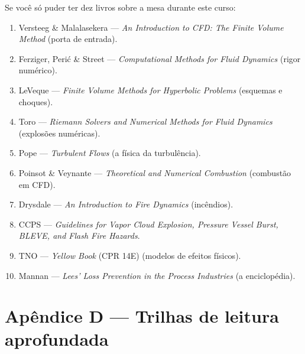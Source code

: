 \documentclass[10pt,a4paper,twocolumn,openany]{report}
\begin{document}
Se você só puder ter dez livros sobre a mesa durante este curso:
\begin{enumerate}
  \item Versteeg \& Malalasekera --- \emph{An Introduction to CFD: The Finite Volume Method} (porta de entrada).
  \item Ferziger, Perić \& Street --- \emph{Computational Methods for Fluid Dynamics} (rigor numérico).
  \item LeVeque --- \emph{Finite Volume Methods for Hyperbolic Problems} (esquemas e choques).
  \item Toro --- \emph{Riemann Solvers and Numerical Methods for Fluid Dynamics} (explosões numéricas).
  \item Pope --- \emph{Turbulent Flows} (a física da turbulência).
  \item Poinsot \& Veynante --- \emph{Theoretical and Numerical Combustion} (combustão em CFD).
  \item Drysdale --- \emph{An Introduction to Fire Dynamics} (incêndios).
  \item CCPS --- \emph{Guidelines for Vapor Cloud Explosion, Pressure Vessel Burst, BLEVE, and Flash Fire Hazards}.
  \item TNO --- \emph{Yellow Book} (CPR 14E) (modelos de efeitos físicos).
  \item Mannan --- \emph{Lees' Loss Prevention in the Process Industries} (a enciclopédia).
\end{enumerate}

\chapter*{Apêndice D --- Trilhas de leitura aprofundada}
\end{document}
